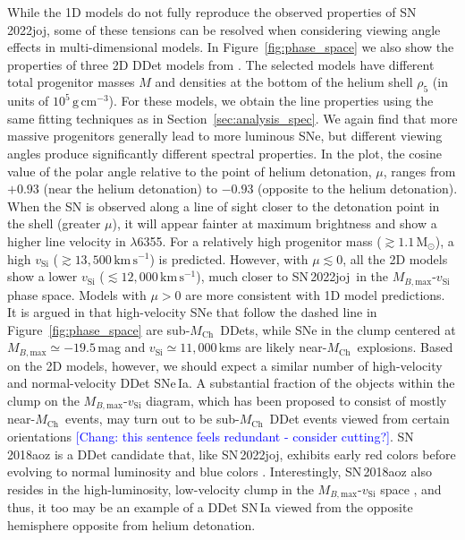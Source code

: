 \documentclass[twocolumn]{aastex631}
\newcommand{\sn}{SN\,2022joj}
\newcommand{\Mch}{$M_\mathrm{Ch}$}
\newcommand{\kms}{$\mathrm{km}\,\mathrm{s}^{-1}$}
\newcommand{\chang}[1]{\textcolor{blue}{[Chang: #1]}}
\begin{document}
\begin{CJK*}{UTF8}{gbsn}
While the 1D models do not fully reproduce the observed properties of \sn, some of these tensions can be resolved when considering viewing angle effects in multi-dimensional models. In Figure~\ref{fig:phase_space} we also show the properties of three 2D DDet models from \citet{Shen_2D_2021}. The selected models have different total progenitor masses $M$ and densities at the bottom of the helium shell $\rho_5$ (in units of $\mathrm{10^5\,g\,cm^{-3}}$). For these models, we obtain the  line properties using the same fitting techniques as in Section~\ref{sec:analysis_spec}. We again find that more massive progenitors generally lead to more luminous SNe, but different viewing angles produce significantly different spectral properties. In the plot, the cosine value of the polar angle relative to the point of helium detonation, $\mu$, ranges from $+0.93$ (near the helium detonation) to $-0.93$ (opposite to the helium detonation). When the SN is observed along a line of sight closer to the detonation point in the shell (greater $\mu$), it will appear fainter at maximum brightness and show a higher line velocity in  $\lambda$6355. For a relatively high progenitor mass ($\gtrsim$$1.1\,\mathrm{M_\odot}$), a high $v_\mathrm{Si}$ ($\gtrsim$$13,500$\,\kms) is predicted. However, with $\mu\lesssim0$, all the 2D models show a lower $v_\mathrm{Si}$ ($\lesssim$$12,000$\,\kms), much closer to \sn\ in the $M_{B,\mathrm{max}}$-$v_\mathrm{Si}$ phase space. Models with $\mu>0$ are more consistent with 1D model predictions. It is argued in \citep{polin_observational_2019} that high-velocity SNe that follow the dashed line in Figure~\ref{fig:phase_space} are sub-\Mch\ DDets, while SNe in the clump centered at $M_{B,\mathrm{max}}\simeq-19.5$\,mag and $v_\mathrm{Si}\simeq11,000$\,kms are likely near-\Mch\ explosions. Based on the 2D models, however, we should expect a similar number of high-velocity and normal-velocity DDet SNe\,Ia. A substantial fraction of the objects within the clump on the $M_{B,\mathrm{max}}$-$v_\mathrm{Si}$ diagram, which has been proposed to consist of mostly near-\Mch\ events, may turn out to be sub-\Mch\ DDet events viewed from certain orientations \citep{Shen_2D_2021} \chang{this sentence feels redundant - consider cutting?}. SN\,2018aoz is a DDet candidate that, like \sn, exhibits early red colors before evolving to normal luminosity and blue colors \citep{Ni_2022}. Interestingly, SN\,2018aoz also resides in the high-luminosity, low-velocity clump in the $M_{B,\mathrm{max}}$-$v_\mathrm{Si}$ space \citep{Ni_18aoz_2023}, and thus, it too may be an example of a DDet SN\,Ia viewed from the opposite hemisphere opposite from helium detonation.


\end{CJK*}
\end{document}
